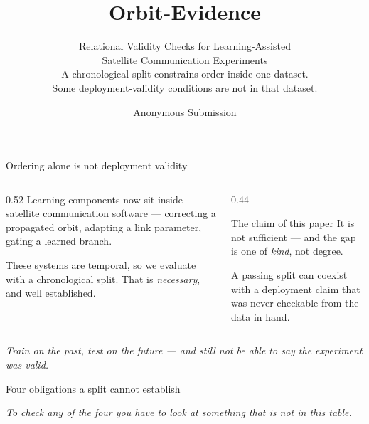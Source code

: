 \documentclass[aspectratio=169,11pt]{beamer}
\title{Orbit-Evidence}
\subtitle{Relational Validity Checks for Learning-Assisted\\
Satellite Communication Experiments\\[0.9em]
\normalfont\small A chronological split constrains order inside one dataset.\\
\normalfont\small Some deployment-validity conditions are not in that dataset.}
\date{}
\author{Anonymous Submission}
\newcommand{\msg}[1]{%
  \vfill\vspace{0.2em}%
  \begin{center}\begin{minipage}{0.92\textwidth}\centering
  \small\itshape\color{black!70}#1
  \end{minipage}\end{center}}
\begin{document}
{
\begin{frame}[plain]
  \maketitle
\end{frame}}

\begin{frame}{Ordering alone is not deployment validity}
  \begin{columns}[T,onlytextwidth]
    \begin{column}{0.52\textwidth}
      Learning components now sit inside satellite communication software ---
      correcting a propagated orbit, adapting a link parameter, gating a learned branch.

      \vspace{0.9em}
      These systems are temporal, so we evaluate with a chronological split.
      That is \emph{necessary}, and well established.
    \end{column}
    \begin{column}{0.44\textwidth}
      \begin{block}{The claim of this paper}
        It is \alert{not sufficient} --- and the gap is one of \emph{kind}, not degree.
      \end{block}
      \vspace{0.4em}
      \small A passing split can coexist with a deployment claim that was never checkable
      from the data in hand.
    \end{column}
  \end{columns}
  \msg{Train on the past, test on the future --- and still not be able to say the
       experiment was valid.}
\end{frame}

\begin{frame}{Four obligations a split cannot establish}
  \vspace{-0.3em}
  \begin{center}\end{center}
  \msg{To check any of the four you have to look at something that is \emph{not} in this table.}
\end{frame}
\end{document}
